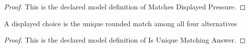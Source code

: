 \begin{proof}
  This is the declared model definition of Matches Displayed Pressure.
\end{proof}
\begin{definition}
  \label{def:physics:phyx-mini-0443:phyxminiproblems-problemphyxmini0443-isuniquematchinganswer}
  A displayed choice is the unique rounded match among all four alternatives
\end{definition}
\begin{proof}
  This is the declared model definition of Is Unique Matching Answer.
\end{proof}

